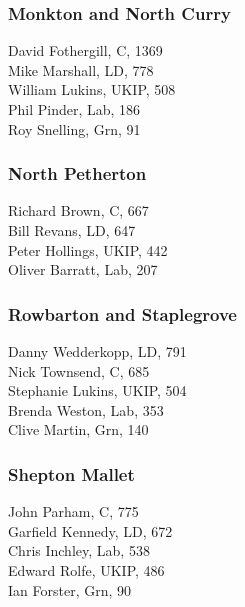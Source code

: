 \documentclass[a4paper,openany,10pt]{book}
\begin{document}
\subsubsection*{Monkton and North Curry}



David Fothergill, C, 1369\\
Mike Marshall, LD, 778\\
William Lukins, UKIP, 508\\
Phil Pinder, Lab, 186\\
Roy Snelling, Grn, 91\\


\subsubsection*{North Petherton}



Richard Brown, C, 667\\
Bill Revans, LD, 647\\
Peter Hollings, UKIP, 442\\
Oliver Barratt, Lab, 207\\


\subsubsection*{Rowbarton and Staplegrove}



Danny Wedderkopp, LD, 791\\
Nick Townsend, C, 685\\
Stephanie Lukins, UKIP, 504\\
Brenda Weston, Lab, 353\\
Clive Martin, Grn, 140\\


\subsubsection*{Shepton Mallet}



John Parham, C, 775\\
Garfield Kennedy, LD, 672\\
Chris Inchley, Lab, 538\\
Edward Rolfe, UKIP, 486\\
Ian Forster, Grn, 90\\
\end{document}
